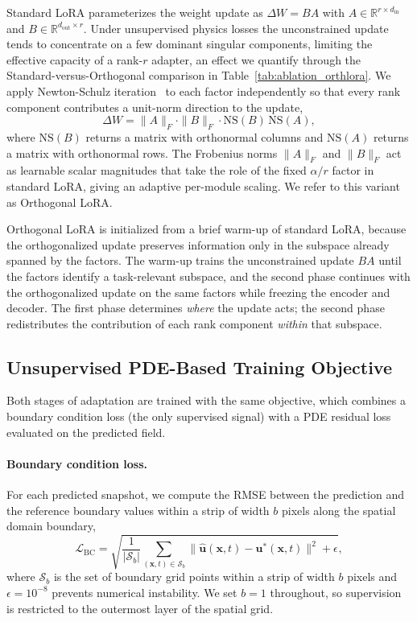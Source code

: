 \documentclass{article}
\begin{document}
Standard LoRA parameterizes the weight update as $\Delta W = BA$ with $A \in \mathbb{R}^{r \times d_{\mathrm{in}}}$ and $B \in \mathbb{R}^{d_{\mathrm{out}} \times r}$. Under unsupervised physics losses the unconstrained update tends to concentrate on a few dominant singular components, limiting the effective capacity of a rank-$r$ adapter, an effect we quantify through the Standard-versus-Orthogonal comparison in Table~\ref{tab:ablation_orthlora}. We apply Newton-Schulz iteration~\cite{jordan2024muon} to each factor independently so that every rank component contributes a unit-norm direction to the update,
\begin{equation}
\Delta W = \|A\|_F \cdot \|B\|_F \cdot \mathrm{NS}(B)\,\mathrm{NS}(A),
\end{equation}
where $\mathrm{NS}(B)$ returns a matrix with orthonormal columns and $\mathrm{NS}(A)$ returns a matrix with orthonormal rows. The Frobenius norms $\|A\|_F$ and $\|B\|_F$ act as learnable scalar magnitudes that take the role of the fixed $\alpha/r$ factor in standard LoRA, giving an adaptive per-module scaling. We refer to this variant as Orthogonal LoRA.

Orthogonal LoRA is initialized from a brief warm-up of standard LoRA, because the orthogonalized update preserves information only in the subspace already spanned by the factors. The warm-up trains the unconstrained update $BA$ until the factors identify a task-relevant subspace, and the second phase continues with the orthogonalized update on the same factors while freezing the encoder and decoder. The first phase determines \emph{where} the update acts; the second phase redistributes the contribution of each rank component \emph{within} that subspace.

\subsection{Unsupervised PDE-Based Training Objective}
\label{sec:physlora}

Both stages of adaptation are trained with the same objective, which combines a boundary condition loss (the only supervised signal) with a PDE residual loss evaluated on the predicted field.

\paragraph{Boundary condition loss.}
For each predicted snapshot, we compute the RMSE between the prediction and the reference boundary values within a strip of width $b$ pixels along the spatial domain boundary,
\begin{equation}
\mathcal{L}_{\mathrm{BC}} = \sqrt{\frac{1}{|\mathcal{S}_b|} \sum_{(\mathbf{x},t) \in \mathcal{S}_b} \|\hat{\mathbf{u}}(\mathbf{x},t) - \mathbf{u}^*(\mathbf{x},t)\|^2 + \epsilon},
\end{equation}
where $\mathcal{S}_b$ is the set of boundary grid points within a strip of width $b$ pixels and $\epsilon = 10^{-8}$ prevents numerical instability. We set $b=1$ throughout, so supervision is restricted to the outermost layer of the spatial grid.
\end{document}

